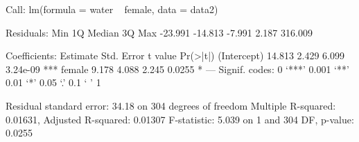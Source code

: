 Call:
lm(formula = water ~ female, data = data2)

Residuals:
Min      1Q  Median      3Q     Max 
-23.991 -14.813  -7.991   2.187 316.009 

Coefficients:
Estimate Std. Error t value Pr(>|t|)    
(Intercept)   14.813      2.429   6.099 3.24e-09 ***
female         9.178      4.088   2.245   0.0255 *  
---
Signif. codes:  0 ‘***’ 0.001 ‘**’ 0.01 ‘*’ 0.05 ‘.’ 0.1 ‘ ’ 1

Residual standard error: 34.18 on 304 degrees of freedom
Multiple R-squared:  0.01631,	Adjusted R-squared:  0.01307 
F-statistic: 5.039 on 1 and 304 DF,  p-value: 0.0255